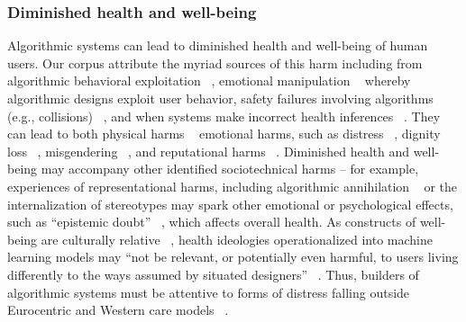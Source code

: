 \subsubsection{Diminished health and well-being} 
Algorithmic systems can lead to diminished health and well-being of human users. Our corpus attribute the myriad sources of this harm including from algorithmic behavioral exploitation ~\cite{Bandy2021, Solon_2017}, emotional manipulation ~\cite{Skirpan_Fiesler_2018} whereby algorithmic designs exploit user behavior, safety failures involving algorithms (e.g., collisions) ~\cite{Dean_Gilbert_Lambert_Zick_2021}, and when systems make incorrect health inferences ~\cite{Obermeyer_2019}. They can lead to both physical harms ~\cite{DeVos_Dhabalia_Shen_Holstein_Eslami_2022, Douglas_2016, Mannes_2020, Redden_Brand_2017}  emotional harms, such as distress ~\cite{Weidinger2022}, dignity loss ~\cite{Brown_Sanci_Hegarty_2021, Mannes_2020}, misgendering ~\cite{Keyes_2018}, and reputational harms ~\cite{Moss_2021, Redden_Brand_2017}. Diminished health and well-being may accompany other identified sociotechnical harms – for example, experiences of representational harms, including algorithmic annihilation ~\cite{Andalibi_Garcia_2021} or the internalization of stereotypes may spark other emotional or psychological effects, such as “epistemic doubt” ~\cite{Wang_2020}, which affects overall health. As constructs of well-being are culturally relative ~\cite{Ng_Ho_Wong_Smith_2003}, health ideologies operationalized into machine learning models may “not be relevant, or potentially even harmful, to users living differently to the ways assumed by situated designers” ~\cite[p. 5]{Docherty_Biega_2022}. Thus, builders of algorithmic systems must be attentive to forms of distress falling outside Eurocentric and Western care models ~\cite{Pendse2022}.


